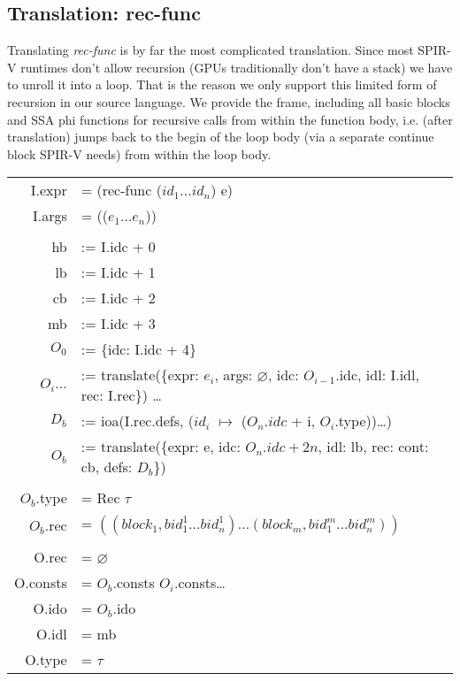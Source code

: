 \documentclass[letterpaper,12pt]{article}
\begin{document}
\newpage
\subsection{Translation: rec-func}

Translating \textit{rec-func} is by far the most complicated translation.
Since most SPIR-V runtimes don't allow recursion (GPUs traditionally
don't have a stack) we have to unroll it into a loop. That is the reason
we only support this limited form of recursion in our source language.
We provide the frame, including all basic blocks and SSA phi functions
for recursive calls from within the function body, i.e. (after translation)
jumps back to the begin of the loop body (via a separate continue block SPIR-V needs)
from within the loop body.

\medskip
\begin{tabularx}{\linewidth}{rl}
	I.expr &= (rec-func\: ($id_1 \dots id_n$) e) \\
	I.args &= (($e_1 \dots e_n$)) \\
	\\
	hb &:= I.idc + 0 \\
	lb &:= I.idc + 1 \\
	cb &:= I.idc + 2 \\
	mb &:= I.idc + 3 \\
	$O_0$ &:= \{idc: I.idc + 4\} \\
	$O_i\dots$ &:= translate(\{expr: $e_i$, args: $\varnothing$, idc: $O_{i - 1}$.idc, idl: I.idl, rec: I.rec\}) \dots \\
	$D_b$ &:= ioa(I.rec.defs, ($id_i$ $\mapsto$ ($O_n.idc$ + i, $O_i$.type))\dots) \\
	$O_b$ &:= translate(\{expr: e, idc: $O_n.idc + 2n$, idl: lb, rec: {cont: cb, defs: $D_b$}\}) \\
	\\
	$O_b$.type &= Rec $\tau$ \\
	$O_b$.rec &= $((block_1, bid_1^1 \dots bid_n^1) \dots (block_m, bid_1^m \dots bid_n^m))$ \\
	\\
	O.rec &= $\varnothing$ \\
	O.consts &= $O_b$.consts $O_i$.consts\dots \\
	O.ido &= $O_b$.ido \\
	O.idl &= mb \\
	O.type &= $\tau$
\end{tabularx}

\medskip
\end{document}
